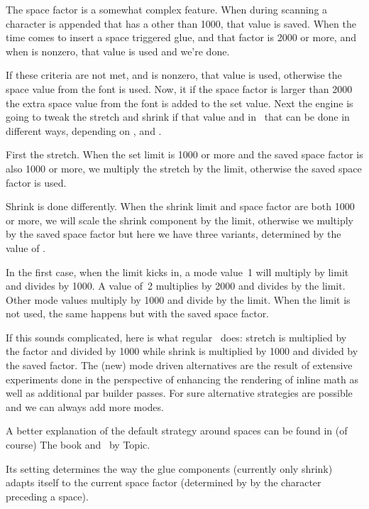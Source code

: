 The space factor is a somewhat complex feature. When during scanning a character
is appended that has a  other than 1000, that value is saved. When
the time comes to insert a space triggered glue, and that factor is 2000 or more,
and when  is nonzero, that value is used and we're done.

If these criteria are not met, and  is nonzero, that value is
used, otherwise the space value from the font is used. Now, it if the space factor
is larger than 2000 the extra space value from the font is added to the set value.
Next the engine is going to tweak the stretch and shrink if that value and in
\LUAMETATEX\ that can be done in different ways, depending on ,
 and .

First the stretch. When the set limit is 1000 or more and the saved space factor
is also 1000 or more, we multiply the stretch by the limit, otherwise the saved
space factor is used.

Shrink is done differently. When the shrink limit and space factor are both 1000
or more, we will scale the shrink component by the limit, otherwise we multiply
by the saved space factor but here we have three variants, determined by the
value of .

In the first case, when the limit kicks in, a mode value~1 will multiply by limit
and divides by 1000. A value of~2 multiplies by 2000 and divides by the limit.
Other mode values multiply by 1000 and divide by the limit. When the limit is not
used, the same happens but with the saved space factor.

If this sounds complicated, here is what regular \TEX\ does: stretch is
multiplied by the factor and divided by 1000 while shrink is multiplied by 1000
and divided by the saved factor. The (new) mode driven alternatives are the
result of extensive experiments done in the perspective of enhancing the
rendering of inline math as well as additional par builder passes. For sure
alternative strategies are possible and we can always add more modes.

A better explanation of the default strategy around spaces can be found in (of
course) The \TEX book and \TEX\ by Topic.

\stopoldprimitive

\startnewprimitive[title={\prm {spacefactormode}}]

Its setting determines the way the glue components (currently only shrink) adapts
itself to the current space factor (determined by by the character preceding a
space).

